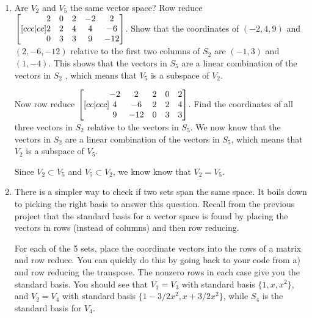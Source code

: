\begin{enumerate}
\begin{enumerate}
	\item Are $V_2$ and $V_5$ the same vector space? Row reduce 
	$\begin{bmatrix}[ccc|cc]
	\begin{matrix} 2\\2\\0 \end{matrix}
	&\begin{matrix} 0\\2\\3 \end{matrix}
	&\begin{matrix} 2\\4\\3 \end{matrix}
	&\begin{matrix} -2\\4\\9 \end{matrix}
	&\begin{matrix} 2\\-6\\-12 \end{matrix}
	\end{bmatrix}$.  Show that the coordinates of $(-2,4,9)$ and  $(2,-6,-12)$ relative to the first two columns of $S_2$ are $(-1,3)$ and $(1,-4)$.
	This shows that the vectors in $S_5$ are a linear combination of the vectors in $S_2$ , which means that $V_5$ is a subspace of $V_2$.
	  
	Now row reduce  
	$\begin{bmatrix}[cc|ccc]
	\begin{matrix} -2\\4\\9 \end{matrix}
	&\begin{matrix} 2\\-6\\-12 \end{matrix}
	&\begin{matrix} 2\\2\\0 \end{matrix}
	&\begin{matrix} 0\\2\\3 \end{matrix}
	&\begin{matrix} 2\\4\\3 \end{matrix}
	\end{bmatrix}$. Find the coordinates of all three vectors in $S_2$ relative to the vectors in $S_5$.   
	We now know that the vectors in $S_2$ are a linear combination of the vectors in $S_5$, which means that $V_2$ is a subspace of $V_5$.  
	
	Since $V_2\subset V_5$ and $V_5\subset V_2$, we know know that $V_2=V_5$.  
	
	
	\item There is a simpler way to check if two sets span the same space. It boils down to picking the right basis to answer this question. Recall from the previous project that the standard basis for a vector space is found by placing the vectors in rows (instead of columns) and then row reducing. 
	
	For each of the 5 sets, place the coordinate vectors into the rows of a matrix and row reduce. You can quickly do this by going back to your code from a) and row reducing the transpose. The nonzero rows in each case give you the standard basis.  You should see that $V_1=V_3$ with standard basis $\{1,x,x^2\}$, and $V_2=V_4$ with standard basis $\{1-3/2x^2,x+3/2x^2\}$, while $S_4$ is the standard basis for $V_4$.	


\end{enumerate}
\end{enumerate}
